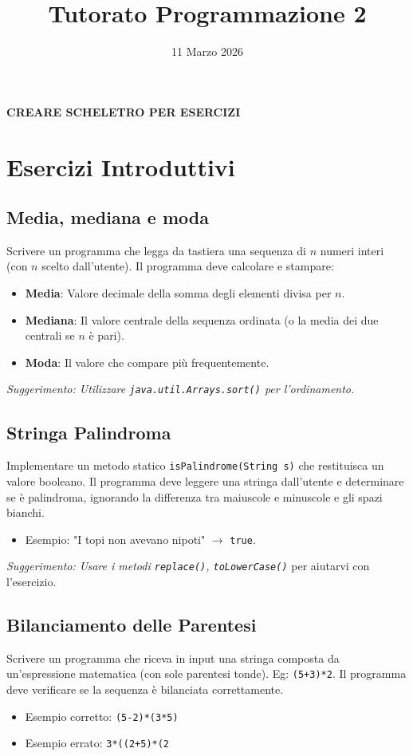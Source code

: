 \documentclass{article}
\title{Tutorato Programmazione 2}
\date{11 Marzo 2026}
\begin{document}
\maketitle

\textbf{CREARE SCHELETRO PER ESERCIZI}

\section{Esercizi Introduttivi}
\subsection{Media, mediana e moda}
Scrivere un programma che legga da tastiera una sequenza di $n$ numeri interi (con $n$ scelto dall'utente). Il programma deve calcolare e stampare:
\begin{itemize}
    \item \textbf{Media}: Valore decimale della somma degli elementi divisa per $n$.
    \item \textbf{Mediana}: Il valore centrale della sequenza ordinata (o la media dei due centrali se $n$ è pari).
    \item \textbf{Moda}: Il valore che compare più frequentemente.
\end{itemize}
\textit{Suggerimento: Utilizzare \texttt{java.util.Arrays.sort()} per l'ordinamento.}

\subsection{Stringa Palindroma}
Implementare un metodo statico \texttt{isPalindrome(String s)} che restituisca un valore booleano. Il programma deve leggere una stringa dall'utente e determinare se è palindroma, ignorando la differenza tra maiuscole e minuscole e gli spazi bianchi.
\begin{itemize}
    \item Esempio: "I topi non avevano nipoti" $\rightarrow$ \texttt{true}.
\end{itemize}
\textit{Suggerimento: Usare i metodi \texttt{replace()}, \texttt{toLowerCase()}} per aiutarvi con l'esercizio.

\subsection{Bilanciamento delle Parentesi}
Scrivere un programma che riceva in input una stringa composta da un'espressione matematica (con sole parentesi tonde). Eg: \texttt{(5+3)*2}. Il programma deve verificare se la sequenza è bilanciata correttamente.
\begin{itemize}
    \item Esempio corretto: \texttt{(5-2)*(3*5)}
    \item Esempio errato: \texttt{3*((2+5)*(2}
\end{itemize}
\end{document}
